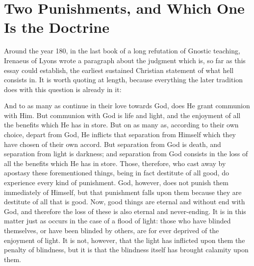 \section{Two Punishments, and Which One Is the Doctrine}

Around the year 180, in the last book of a long refutation of Gnostic teaching, Irenaeus of Lyons wrote a paragraph about the judgment which is, so far as this essay could establish, the earliest sustained Christian statement of what hell consists in. It is worth quoting at length, because everything the later tradition does with this question is already in it:

\begin{studyframe}
And to as many as continue in their love towards God, does He grant communion with Him. But communion with God is life and light, and the enjoyment of all the benefits which He has in store. But on as many as, according to their own choice, depart from God, He inflicts that separation from Himself which they have chosen of their own accord. But separation from God is death, and separation from light is darkness; and separation from God consists in the loss of all the benefits which He has in store. Those, therefore, who cast away by apostasy these forementioned things, being in fact destitute of all good, do experience every kind of punishment. God, however, does not punish them immediately of Himself, but that punishment falls upon them because they are destitute of all that is good. Now, good things are eternal and without end with God, and therefore the loss of these is also eternal and never-ending. It is in this matter just as occurs in the case of a flood of light: those who have blinded themselves, or have been blinded by others, are for ever deprived of the enjoyment of light. It is not, however, that the light has inflicted upon them the penalty of blindness, but it is that the blindness itself has brought calamity upon them.
\end{studyframe}

